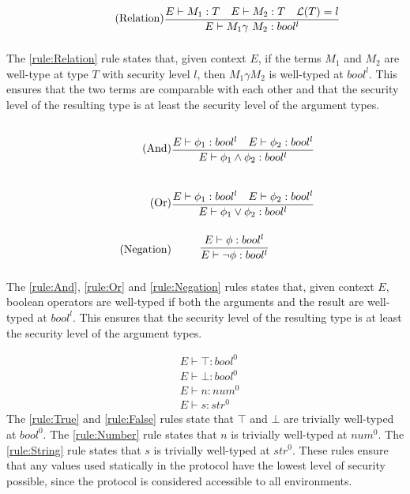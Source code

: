\begin{align*}
\tag{Relation}\label{rule:Relation} &\infrule{E\vdash M_1:T\quad E\vdash M_2:T\quad\level{T}=l}{E\vdash M_1 \gamma\ M_2:bool^{l}}
\end{align*}
The \ref{rule:Relation} rule states that, given context $E$, if the terms $M_1$ and $M_2$ are well-type at type $T$ with security level $l$, then $M_1\gamma M_2$ is well-typed at $bool^l$. This ensures that the two terms are comparable with each other and that the security level of the resulting type is at least the security level of the argument types.

\begin{align*}
\tag{And}\label{rule:And} &\infrule{E\vdash \phi_1:bool^l\quad E\vdash \phi_2:bool^l}{E\vdash \phi _1 \land \phi _2:bool^{l}}\\
\tag{Or}\label{rule:Or} &\infrule{E\vdash \phi_1:bool^l\quad E\vdash \phi_2:bool^l}{E\vdash \phi _1 \lor \phi _2:bool^{l}}\\
\tag{Negation}\label{rule:Negation} &\infrule{E\vdash \phi :bool^l }{E\vdash \neg \phi :bool^l}
\end{align*}

The \ref{rule:And}, \ref{rule:Or} and \ref{rule:Negation} rules states that, given context $E$, boolean operators are well-typed if both the arguments and the result are well-typed at $bool^l$. This ensures that the security level of the resulting type is at least the security level of the argument types.

\begin{align*}
\tag{True}\label{rule:True} &E\vdash\top:bool^0\\
\tag{False}\label{rule:False} &E\vdash\bot:bool^0\\
\tag{Number}\label{rule:Number} &E\vdash n:{num^0}\\
\tag{String}\label{rule:String} &E\vdash s:{str^0}
\end{align*}
The \ref{rule:True} and \ref{rule:False} rules state that $\top$ and $\bot$ are trivially well-typed at $bool^0$.
The \ref{rule:Number} rule states that $n$ is trivially well-typed at $num^0$.
The \ref{rule:String} rule states that $s$ is trivially well-typed at $str^0$.
These rules ensure that any values used statically in the protocol have the lowest level of security possible, since the protocol is considered accessible to all environments.

\FloatBarrier